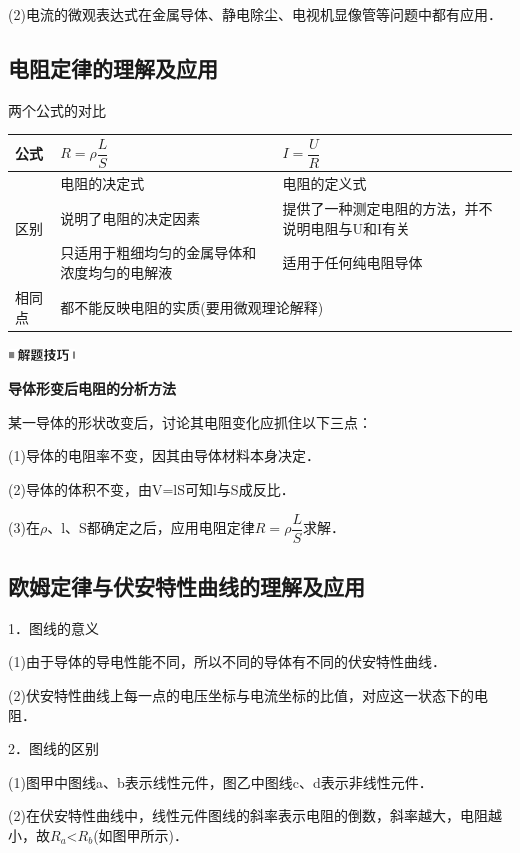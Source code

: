 (2)电流的微观表达式在金属导体、静电除尘、电视机显像管等问题中都有应用．

\subsection{电阻定律的理解及应用}

两个公式的对比

\begin{longtable}[]{@{}m{1.2cm}m{6cm}m{6cm}@{}}
\toprule
公式 & $R=\rho \dfrac{L}{S}$ & $I=\dfrac{U}{R}$\tabularnewline
\midrule
\endhead
\multirow{3}{1cm}{区别} & 电阻的决定式 & 电阻的定义式\tabularnewline
& 说明了电阻的决定因素 &
提供了一种测定电阻的方法，并不说明电阻与U和I有关\tabularnewline
& 只适用于粗细均匀的金属导体和浓度均匀的电解液 &
适用于任何纯电阻导体\tabularnewline
相同点 &\multicolumn{2}{l}{ 都不能反映电阻的实质(要用微观理论解释) }\tabularnewline
\bottomrule
\end{longtable}

\begin{center}\includegraphics[width=0.70764in,height=0.12292in]{media/image37.png}\end{center}
\begin{center}
	\textbf{导体形变后电阻的分析方法}
\end{center}

某一导体的形状改变后，讨论其电阻变化应抓住以下三点：

(1)导体的电阻率不变，因其由导体材料本身决定．

(2)导体的体积不变，由V=lS可知l与S成反比．

(3)在$\rho$、l、S都确定之后，应用电阻定律$R=\rho \dfrac{L}{S}$求解．
\newpage
\subsection{欧姆定律与伏安特性曲线的理解及应用}


1．图线的意义

(1)由于导体的导电性能不同，所以不同的导体有不同的伏安特性曲线．

(2)伏安特性曲线上每一点的电压坐标与电流坐标的比值，对应这一状态下的电阻．

2．图线的区别

(1)图甲中图线a、b表示线性元件，图乙中图线c、d表示非线性元件．

(2)在伏安特性曲线中，线性元件图线的斜率表示电阻的倒数，斜率越大，电阻越小，故$R_a$\textless $R_b$(如图甲所示)．

